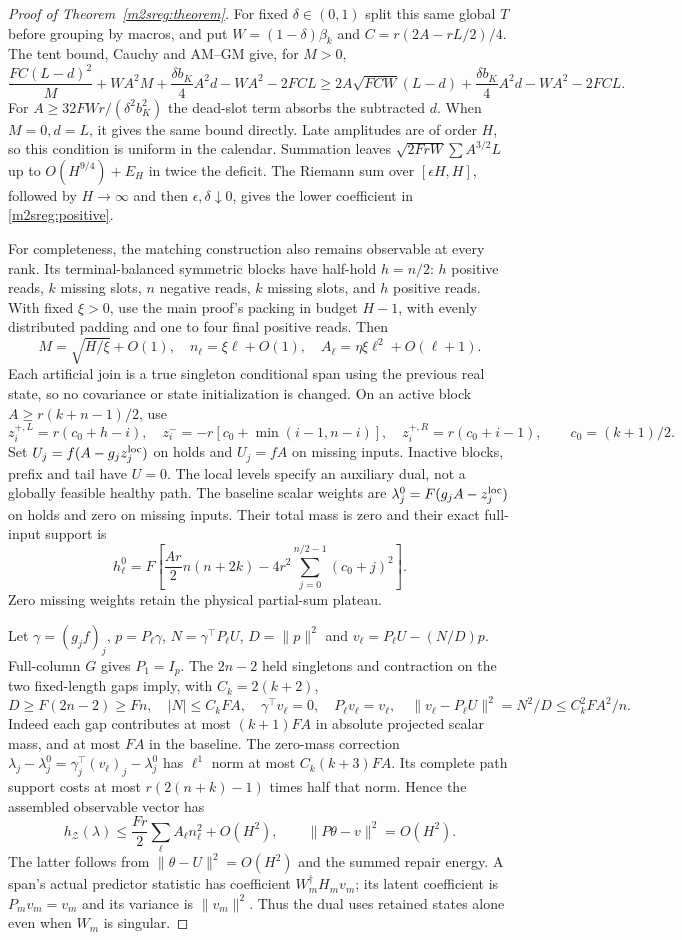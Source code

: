 \begin{proof}[Proof of Theorem~\ref{m2sreg:theorem}]
For fixed $\delta\in(0,1)$ split this same global $T$ before grouping
by macros, and put $W=(1-\delta)\beta_k$ and
$C=r(2A-rL/2)/4$. The tent bound, Cauchy and AM--GM give, for $M>0$,
\[
\frac{FC(L-d)^2}{M}+WA^2M+
 \frac{\delta b_K}{4}A^2d-WA^2-2FCL
\ge 2A\sqrt{FCW}(L-d)+
 \frac{\delta b_K}{4}A^2d-WA^2-2FCL .
\]
For $A\ge32FWr/(\delta^2b_K^2)$ the dead-slot term absorbs
the subtracted $d$. When $M=0,d=L$, it gives the same bound directly.
Late amplitudes are of order $H$, so this condition is uniform
in the calendar. Summation leaves
$\sqrt{2FrW}\sum A^{3/2}L$ up to $O(H^{9/4})+E_H$ in twice
the deficit. The Riemann sum over $[\epsilon H,H]$, followed by
$H\to\infty$ and then $\epsilon,\delta\downarrow0$, gives
the lower coefficient in \eqref{m2sreg:positive}.

For completeness, the matching construction also remains observable
at every rank. Its terminal-balanced symmetric blocks have
half-hold $h=n/2$: $h$ positive reads, $k$ missing slots, $n$
negative reads, $k$ missing slots, and $h$ positive reads.
With fixed $\xi>0$, use the main proof's packing in budget $H-1$,
with evenly distributed padding and one to four final positive reads.
Then
\[
M=\sqrt{H/\xi}+O(1),\quad
n_\ell=\xi\ell+O(1),\quad
A_\ell=\eta\xi\ell^2+O(\ell+1).
\]
Each artificial join is a true singleton conditional span using the
previous real state, so no covariance or state initialization is changed.
On an active block $A\ge r(k+n-1)/2$, use
\[
z_i^{+,L}=r(c_0+h-i),\quad
z_i^-=-r[c_0+\min(i-1,n-i)],\quad
z_i^{+,R}=r(c_0+i-1),\qquad c_0=(k+1)/2 .
\]
Set $U_j=f(A-g_jz_j^{\rm loc})$ on holds and $U_j=fA$ on missing
inputs. Inactive blocks, prefix and tail have $U=0$.
The local levels specify an auxiliary dual, not a globally feasible
healthy path. The baseline scalar weights are
$\lambda_j^0=F(g_jA-z_j^{\rm loc})$ on holds and zero on missing inputs.
Their total mass is zero and their exact full-input support is
\[
h_\ell^0=F\left[\frac{Ar}{2}n(n+2k)
 -4r^2\sum_{j=0}^{n/2-1}(c_0+j)^2\right].
\]
Zero missing weights retain the physical partial-sum plateau.

Let $\gamma=(g_jf)_j$, $p=P_\ell\gamma$,
$N=\gamma^\top P_\ell U$, $D=\|p\|^2$ and
$v_\ell=P_\ell U-(N/D)p$.
Full-column $G$ gives $P_1=I_p$. The $2n-2$ held singletons and
contraction on the two fixed-length gaps imply, with $C_k=2(k+2)$,
\[
D\ge F(2n-2)\ge Fn,\quad |N|\le C_kFA,\quad
\gamma^\top v_\ell=0,\quad P_\ell v_\ell=v_\ell,\quad
\|v_\ell-P_\ell U\|^2=N^2/D\le C_k^2FA^2/n .
\]
Indeed each gap contributes at most $(k+1)FA$ in absolute projected
scalar mass, and at most $FA$ in the baseline.
The zero-mass correction
$\lambda_j-\lambda_j^0=\gamma_j^\top(v_\ell)_j-\lambda_j^0$
has $\ell^1$ norm at most $C_k(k+3)FA$.
Its complete path support costs at most
$r(2(n+k)-1)$ times half that norm.
Hence the assembled observable vector has
\[
h_{\mathcal Z}(\lambda)\le\frac{Fr}{2}
 \sum_\ell A_\ell n_\ell^2+O(H^2),\qquad
\|P\theta-v\|^2=O(H^2).
\]
The latter follows from $\|\theta-U\|^2=O(H^2)$ and the summed
repair energy. A span's actual predictor statistic has coefficient
$W_m^\dagger H_mv_m$; its latent coefficient is $P_mv_m=v_m$
and its variance is $\|v_m\|^2$.
Thus the dual uses retained states alone even when $W_m$ is singular.


\end{proof}
